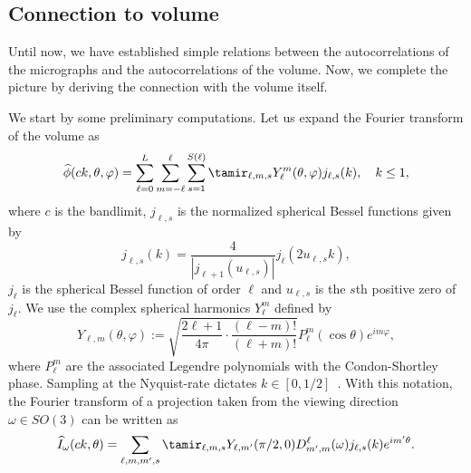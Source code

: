 \documentclass[9pt,twocolumn,twoside,lineno]{pnas-new}
\begin{document}
\subsection{Connection to volume}

Until now, we have established  simple relations between the autocorrelations of the micrographs and the autocorrelations of the volume. Now, we complete the picture by deriving the connection with the volume itself.

We start by some preliminary computations. Let us  expand the Fourier transform of the volume as
\begin{equation} \label{eq:volume_expansion_app} 
\widehat \phi(ck, \theta, \varphi) = \sum_{\ell = 0}^L\sum_{m=-\ell}^{\ell}\sum_{s=1}^{S(\ell)}\tamir_{\ell, m, s}Y_{\ell}^m(\theta,\varphi)j_{\ell,s}(k), \quad k\leq 1,
\end{equation}
where $c$ is the bandlimit, $j_{\ell,s}$ is the normalized spherical Bessel functions given by
\[ j_{\ell, s}(k) = \frac{4}{|j_{\ell+1}(u_{\ell, s})|}j_{\ell}(2u_{\ell,s} k),\]
$j_{\ell}$ is the spherical Bessel function of order $\ell$ and  $u_{\ell,s}$ is the $s$th positive zero of $j_{\ell}$. We use 
the complex spherical harmonics $Y_{\ell}^m$ defined by  
\[ Y_{\ell,m}(\theta,\varphi) := \sqrt{\frac{2\ell+1}{4\pi}\cdot\frac{(\ell-m)!}{(\ell+m)!}}P_{\ell}^m(\cos\theta)e^{i m\varphi},\]
where $P_{\ell}^m$ are the associated Legendre polynomials with the Condon-Shortley phase. 
Sampling at the Nyquist-rate dictates $k\in[0,1/2]$~\cite{levin20173d}.  With this notation, 
the Fourier transform of a  projection taken from the viewing direction $\omega\in SO(3)$ can be written as 
\[ \widehat I_{\omega}(ck,\theta) = \sum_{\ell,m,m',s}\tamir_{\ell,m,s}Y_{\ell,m'}(\pi/2,0)D_{m',m}^{\ell}(\omega)j_{\ell,s}(k)e^{im'\theta}.\]
\end{document}

